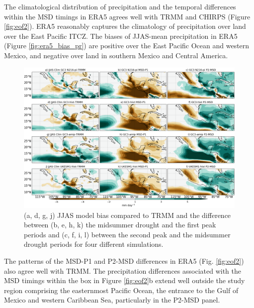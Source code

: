  The climatological distribution of precipitation and the temporal differences within the MSD timings in ERA5 agrees well with TRMM and CHIRPS (Figure \ref{fig:eof2}). ERA5 reasonably captures the climatology of precipitation over land over the East Pacific ITCZ. The biases of JJAS-mean precipitation in ERA5  (Figure \ref{fig:era5_bias_pr}) are positive over the East Pacific Ocean and western Mexico, and negative over land in southern Mexico and Central America. 
 
  \begin{figure}[b!]
\includegraphics[width=\linewidth]{figures/fig2obs_prmodels3.png}
\caption[Composite mean precipitation biases and seasonal variations]{ (a, d, g, j) JJAS model bias compared to TRMM and the difference between  (b, e, h, k)  the midsummer drought and the first peak periods and (c, f, i, l)  between the second peak and the midsummer drought periods for four different simulations.}
\label{fig:model_pr}
\end{figure} 
  
 
  The patterns of the MSD-P1 and P2-MSD differences in ERA5 (Fig. \ref{fig:eof2}) also agree well with TRMM. The precipitation differences associated with the MSD timings within the box in Figure \ref{fig:eof2}b extend well outside the study region comprising the easternmost Pacific Ocean, the entrance to the Gulf of Mexico and western Caribbean Sea, particularly in the P2-MSD panel. 
 


